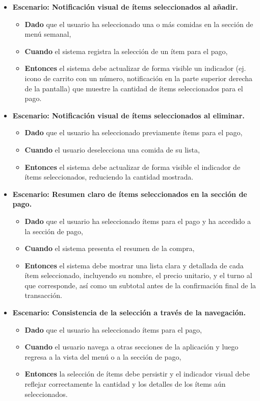 \documentclass[12pt]{article}
\begin{document}
\begin{itemize}
	\item \textbf{Escenario: Notificación visual de ítems seleccionados al añadir.}
	\begin{itemize}
		\item \textbf{Dado} que el usuario ha seleccionado una o más comidas en la sección de menú semanal,
		\item \textbf{Cuando} el sistema registra la selección de un ítem para el pago,
		\item \textbf{Entonces} el sistema debe actualizar de forma visible un indicador (ej. icono de carrito con un número, notificación en la parte superior derecha de la pantalla) que muestre la cantidad de ítems seleccionados para el pago.
	\end{itemize}

	\item \textbf{Escenario: Notificación visual de ítems seleccionados al eliminar.}
	\begin{itemize}
		\item \textbf{Dado} que el usuario ha seleccionado previamente ítems para el pago,
		\item \textbf{Cuando} el usuario deselecciona una comida de su lista,
		\item \textbf{Entonces} el sistema debe actualizar de forma visible el indicador de ítems seleccionados, reduciendo la cantidad mostrada.
	\end{itemize}

	\item \textbf{Escenario: Resumen claro de ítems seleccionados en la sección de pago.}
	\begin{itemize}
		\item \textbf{Dado} que el usuario ha seleccionado ítems para el pago y ha accedido a la sección de pago,
		\item \textbf{Cuando} el sistema presenta el resumen de la compra,
		\item \textbf{Entonces} el sistema debe mostrar una lista clara y detallada de cada ítem seleccionado, incluyendo su nombre, el precio unitario, y el turno al que corresponde, así como un subtotal antes de la confirmación final de la transacción.
	\end{itemize}

	\item \textbf{Escenario: Consistencia de la selección a través de la navegación.}
	\begin{itemize}
		\item \textbf{Dado} que el usuario ha seleccionado ítems para el pago,
		\item \textbf{Cuando} el usuario navega a otras secciones de la aplicación y luego regresa a la vista del menú o a la sección de pago,
		\item \textbf{Entonces} la selección de ítems debe persistir y el indicador visual debe reflejar correctamente la cantidad y los detalles de los ítems aún seleccionados.
	\end{itemize}
\end{itemize}
\end{document}
